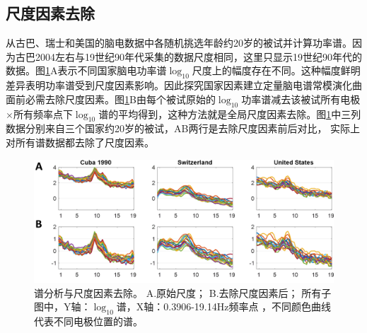 \subsection{尺度因素去除}
从古巴、瑞士和美国的脑电数据中各随机挑选年龄约20岁的被试并计算功率谱。因为古巴2004左右与19世纪90年代采集的数据尺度相同，这里只显示19世纪90年代的数据。图\ref{6:gsf}A表示不同国家脑电功率谱$\log_{10}$尺度上的幅度存在不同。这种幅度鲜明差异表明功率谱受到尺度因素影响。因此探究国家因素建立定量脑电谱常模演化曲面前必需去除尺度因素。图\ref{6:gsf}B由每个被试原始的$\log_{10}$功率谱减去该被试所有电极$\times$所有频率点下$\log_{10}$谱的平均得到，这种方法就是全局尺度因素去除。图\ref{6:gsf}中三列数据分别来自三个国家约20岁的被试，AB两行是去除尺度因素前后对比，
实际上对所有谱数据都去除了尺度因素。
\begin{figure}[!ht]
\includegraphics[width=15cm]{pic/Norm/figure4.png}
\caption{谱分析与尺度因素去除。 A.原始尺度； B.去除尺度因素后； 所有子图中，Y轴：$\log_{10}$谱，X轴：0.3906-19.14Hz频率点
，不同颜色曲线代表不同电极位置的谱。}
\label{6:gsf}
\end{figure}

